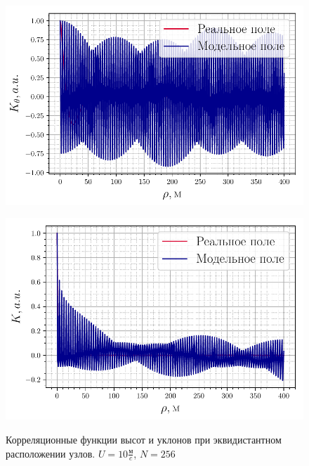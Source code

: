 \begin{figure}[h!]
	\begin{minipage}{0.49\linewidth}
			\centering
			\includegraphics[width=\linewidth]{fig/correlation_height_slopes0.pdf}
			\label{fig:ch0}		
	\end{minipage}
	\hfill
	\begin{minipage}{0.49\linewidth}
			\centering
			\includegraphics[width=\linewidth]{fig/correlation_angles_slopes0.pdf}
			\label{fig:ca0}		
	\end{minipage}
	\caption{Корреляционные функции высот и уклонов при эквидистантном расположении узлов. $U=10 \frac{\text{м}}{c}$, $N=256$}
\end{figure}

